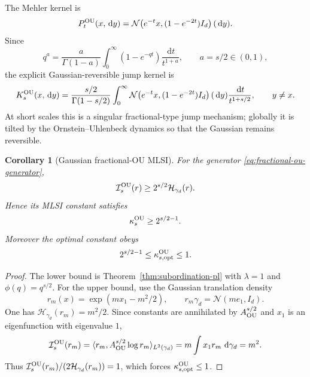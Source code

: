 \documentclass[11pt]{article}
\newtheorem{corollary}[theorem]{Corollary}
\theoremstyle{definition}
\newcommand{\dd}{\,\mathrm d}
\newcommand{\cI}{\mathcal I}
\newcommand{\cH}{\mathcal H}
\begin{document}
The Mehler kernel is
\begin{equation}\label{eq:mehler-kernel}
  P_t^{\rm OU}(x,\dd y)
  =\mathcal N\!\left(e^{-t}x,(1-e^{-2t})I_d\right)(\dd y).
\end{equation}
Since
\[
  q^{a}=\frac{a}{\Gamma(1-a)}
  \int_0^\infty(1-e^{-qt})\frac{\dd t}{t^{1+a}},
  \qquad a=s/2\in(0,1),
\]
the explicit Gaussian-reversible jump kernel is
\begin{equation}\label{eq:fractional-ou-jump-kernel}
  K_s^{\rm OU}(x,\dd y)
  =\frac{s/2}{\Gamma(1-s/2)}
  \int_0^\infty
  \mathcal N\!\left(e^{-t}x,(1-e^{-2t})I_d\right)(\dd y)
  \frac{\dd t}{t^{1+s/2}},
  \qquad y\neq x.
\end{equation}
At short scales this is a singular fractional-type jump mechanism; globally
it is tilted by the Ornstein--Uhlenbeck dynamics so that the Gaussian remains
reversible.

\begin{corollary}[Gaussian fractional-OU MLSI]
\label{cor:gaussian-fractional-ou-pl}
For the generator \eqref{eq:fractional-ou-generator},
\begin{equation}\label{eq:gaussian-fractional-ou-mlsi}
  \cI_s^{\rm OU}(r)
  \geq 2^{s/2}\cH_{\gamma_d}(r).
\end{equation}
Hence its MLSI constant satisfies
\begin{equation}\label{eq:gaussian-fractional-ou-pl-constant}
  \kappa_s^{\rm OU}\geq 2^{s/2-1}.
\end{equation}
Moreover the optimal constant obeys
\begin{equation}\label{eq:gaussian-fractional-ou-bracket}
  2^{s/2-1}\leq\kappa_{s,\rm opt}^{\rm OU}\leq1.
\end{equation}
\end{corollary}

\begin{proof}
The lower bound is Theorem~\ref{thm:subordination-pl} with
$\lambda=1$ and $\phi(q)=q^{s/2}$.  For the upper bound, use the Gaussian
translation density
\[
  r_m(x)=\exp(mx_1-m^2/2),
  \qquad r_m\gamma_d=\mathcal N(me_1,I_d).
\]
One has $\cH_{\gamma_d}(r_m)=m^2/2$.  Since constants are annihilated by
$A_{\rm OU}^{s/2}$ and $x_1$ is an eigenfunction with eigenvalue $1$,
\[
  \cI_s^{\rm OU}(r_m)
  =\langle r_m,A_{\rm OU}^{s/2}\log r_m\rangle_{L^2(\gamma_d)}
  =m\int x_1r_m\,\dd\gamma_d
  =m^2.
\]
Thus $\cI_s^{\rm OU}(r_m)/(2\cH_{\gamma_d}(r_m))=1$, which forces
$\kappa_{s,\rm opt}^{\rm OU}\leq1$.
\end{proof}
\end{document}
